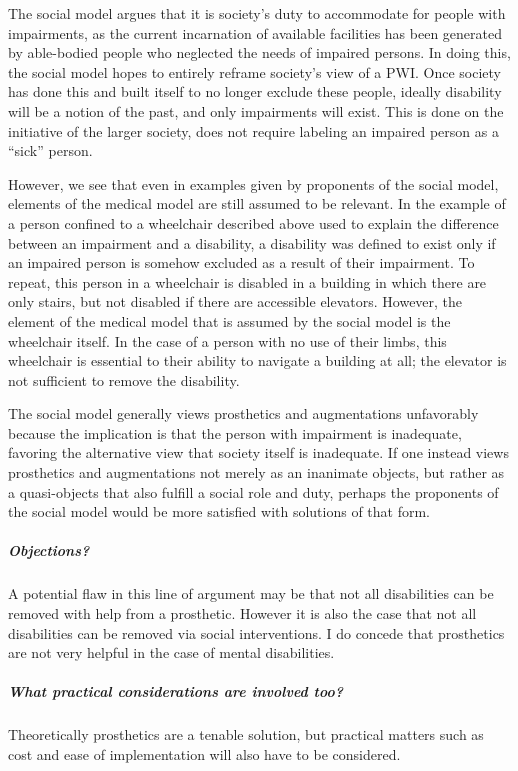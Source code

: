 \documentclass[a4paper]{article}
\begin{document}
The social model argues that it is society's duty to accommodate for people
with impairments, as the current incarnation of available facilities has been
generated by able-bodied people who neglected the needs of impaired persons.
In doing this, the social model hopes to entirely reframe society's view of a
PWI. Once society has done this and built itself to no longer exclude these
people, ideally disability will be a notion of the past, and only impairments
will exist. This is done on the initiative of the larger society, does not
require labeling an impaired person as a ``sick'' person.

However, we see that even in examples given by proponents of the social model,
elements of the medical model are still assumed to be relevant. In the
example of a person confined to a wheelchair described above used to explain
the difference between an impairment and a disability, a disability was
defined to exist only if an impaired person is somehow excluded as a result of
their impairment. To repeat, this person in a wheelchair is disabled in a
building in which there are only stairs, but not disabled if there are
accessible elevators. However, the element of the medical model that is
assumed by the social model is the wheelchair itself. In the case of a person
with no use of their limbs, this wheelchair is essential to their ability
to navigate a building at all; the elevator is not sufficient to remove the
disability.

The social model generally views prosthetics and augmentations unfavorably
because the implication is that the person with impairment is inadequate,
favoring the alternative view that society itself is inadequate. If one
instead views prosthetics and augmentations not merely as an inanimate objects,
but rather as a quasi-objects that also fulfill a social role and duty, perhaps
the proponents of the social model would be more satisfied with solutions of
that form.

\subparagraph{Objections?}

A potential flaw in this line of argument may be that not all disabilities can
be removed with help from a prosthetic. However it is also the case that not
all disabilities can be removed via social interventions. I do concede that
prosthetics are not very helpful in the case of mental disabilities.

\subparagraph{What practical considerations are involved too?}

Theoretically prosthetics are a tenable solution, but practical matters such as
cost and ease of implementation will also have to be considered.
\end{document}
